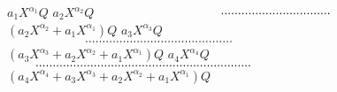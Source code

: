 \begin{wrapfigure}{l}{0.5\textwidth} %
\hspace*{140.pt}\underline{$a_{1}X^{\alpha _1}Q$}\newline
\hspace*{100.pt}\underline{$a_{2}X^{\alpha _2}Q$}$\\
\hspace*{80.pt}\hbox to 4 cm{\qquad\leaders\hbox{$\cdot$}\hfill }$\newline
\hspace*{100.pt}\underline{$(a_{2}X^{\alpha _2} + a_{1}X^{\alpha _1})Q$}\newline
\hspace*{60.pt}\underline{$a_{3}X^{\alpha _3}Q$}$\\
\hspace*{40.pt}\hbox to 5 cm{\qquad\leaders\hbox{$\cdot$}\hfill }$\newline
\hspace*{60.pt}\underline{$(a_{3}X^{\alpha _3} + a_{2}X^{\alpha _2} + a_{1}X^{\alpha _1})Q $}\newline
\hspace*{20.pt}\underline{$a_{4}X^{\alpha _4}Q$}$\\
\hbox to 7 cm{\qquad\leaders\hbox{$\cdot$}\hfill }$\newline
\hspace*{20.pt}\underline{$(a_{4}X^{\alpha _4} + a_{3}X^{\alpha _3} + a_{2}X^{\alpha _2} + a_{1}X^{\alpha _1})Q$}\newline

\end{wrapfigure}



